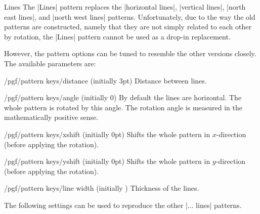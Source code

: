 \begin{pattern}{Lines}
    The |Lines| pattern replaces the |horizontal lines|, |vertical lines|,
    |north east lines|, and |north west lines| patterns. Unfortunately, due to
    the way the old patterns are constructed, namely that they are not simply
    related to each other by rotation, the |Lines| pattern cannot be used as a
    drop-in replacement.

    However, the pattern options can be tuned to resemble the other versions
    closely. The available parameters are:
    \begin{key}{/pgf/pattern keys/distance (initially 3pt)}
        Distance between lines.
    \end{key}
    \begin{key}{/pgf/pattern keys/angle (initially 0)}
        By default the lines are horizontal. The whole pattern is rotated by
        this angle. The rotation angle is measured in the mathematically
        positive sense.
    \end{key}
    \begin{key}{/pgf/pattern keys/xshift (initially 0pt)}
        Shifts the whole pattern in $x$-direction (before applying the
        rotation).
    \end{key}
    \begin{key}{/pgf/pattern keys/yshift (initially 0pt)}
        Shifts the whole pattern in $y$-direction (before applying the
        rotation).
    \end{key}
    \begin{key}{/pgf/pattern keys/line width (initially \string\the\string\pgflinewidth)}
        Thickness of the lines.
    \end{key}
    The following settings can be used to reproduce the other |... lines|
    patterns.
\begin{codeexample}[preamble={\usetikzlibrary{patterns.meta}}]
\end{codeexample}
\end{pattern}

